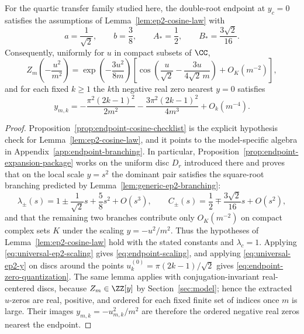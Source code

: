 \begin{theorem}\label{thm:endpoint-zero-quantization}
For the quartic transfer family studied here, the double-root endpoint at $y_c=0$ satisfies the assumptions of Lemma~\ref{lem:ep2-cosine-law} with
\[
a=\frac{1}{\sqrt2},
\qquad
b=\frac38,
\qquad
A_*=\frac12,
\qquad
B_*=\frac{3\sqrt2}{16}.
\]
Consequently, uniformly for \(u\) in compact subsets of \(\CC\),
\begin{equation}\label{eq:endpoint-scaling}
Z_m\!\left(-\frac{u^2}{m^2}\right)
=
\exp\!\left(-\frac{3u^2}{8m}\right)
\left[
\cos\!\left(\frac{u}{\sqrt{2}}-\frac{3u}{4\sqrt{2}\,m}\right)
+ O_K(m^{-2})
\right],
\end{equation}
and for each fixed $k\ge 1$ the $k$th negative real zero nearest $y=0$ satisfies
\begin{equation}\label{eq:endpoint-zero-quantization}
y_{m,k}
=
-\frac{\pi^2(2k-1)^2}{2m^2}
-\frac{3\pi^2(2k-1)^2}{4m^3}
+ O_k(m^{-4}).
\end{equation}
\end{theorem}

\begin{proof}
Proposition~\ref{prop:endpoint-cosine-checklist} is the explicit hypothesis check for Lemma~\ref{lem:ep2-cosine-law}, and it points to the model-specific algebra in Appendix~\ref{app:endpoint-branching}.
In particular, Proposition~\ref{prop:endpoint-expansion-package} works on the uniform disc $D_r$ introduced there and proves that on the local scale \(y=s^2\) the dominant pair satisfies the square-root branching predicted by Lemma~\ref{lem:generic-ep2-branching}:
\[
\lambda_\pm(s)=1\pm \frac{1}{\sqrt2}s+\frac58 s^2+O(s^3),
\qquad
C_\pm(s)=\frac12\mp \frac{3\sqrt2}{16}s+O(s^2),
\]
and that the remaining two branches contribute only \(O_K(m^{-2})\) on compact complex sets \(K\) under the scaling \(y=-u^2/m^2\).
Thus the hypotheses of Lemma~\ref{lem:ep2-cosine-law} hold with the stated constants and \(\lambda_c=1\).
Applying \eqref{eq:universal-ep2-scaling} gives \eqref{eq:endpoint-scaling}, and applying \eqref{eq:universal-ep2-y} on discs around the points \(u_k^{(0)}=\pi(2k-1)/\sqrt2\) gives \eqref{eq:endpoint-zero-quantization}.
The same lemma applies with conjugation-invariant real-centered discs, because \(Z_m\in\ZZ[y]\) by Section~\ref{sec:model}; hence the extracted \(u\)-zeros are real, positive, and ordered for each fixed finite set of indices once \(m\) is large.
Their images \(y_{m,k}=-u_{m,k}^2/m^2\) are therefore the ordered negative real zeros nearest the endpoint.
\end{proof}

